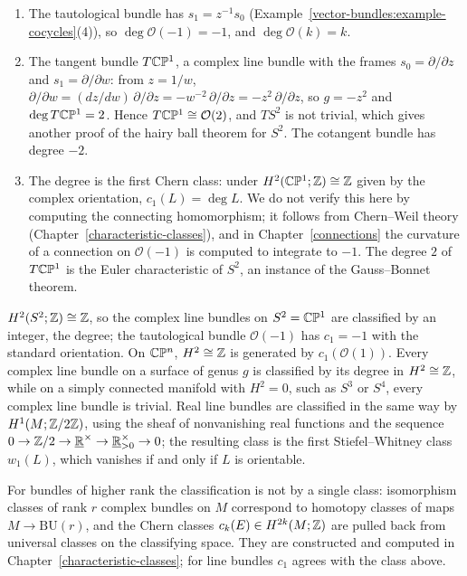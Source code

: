 \begin{example}\label{vector-bundles:example-degrees}
\begin{enumerate}
\item The tautological bundle has $s_1 = z^{-1}s_0$ (Example~\ref{vector-bundles:example-cocycles}(4)), so $\deg\mathcal{O}(-1) = -1$, and $\deg\mathcal{O}(k) = k$.
\item The tangent bundle $T\mathbb{C}\mathbb{P}^1$, a complex line bundle with the frames $s_0 = \partial/\partial z$ and $s_1 = \partial/\partial w$: from $z = 1/w$,
$\partial/\partial w = (dz/dw)\,\partial/\partial z = -w^{-2}\,\partial/\partial z = -z^2\,\partial/\partial z$, so $g = -z^2$ and $\deg T\mathbb{C}\mathbb{P}^1 = 2$. Hence
$T\mathbb{C}\mathbb{P}^1 \cong \mathcal{O}(2)$, and $TS^2$ is not trivial, which gives another proof of the hairy ball theorem for $S^2$. The cotangent bundle has degree $-2$.
\item The degree is the first Chern class: under $H^2(\mathbb{C}\mathbb{P}^1; \mathbb{Z}) \cong \mathbb{Z}$ given by the complex orientation, $c_1(L) = \deg L$. We do not verify this here by computing the
connecting homomorphism; it follows from Chern--Weil theory (Chapter~\ref{characteristic-classes}), and in Chapter~\ref{connections} the curvature of a connection on
$\mathcal{O}(-1)$ is computed to integrate to $-1$. The degree $2$ of $T\mathbb{C}\mathbb{P}^1$ is the Euler characteristic of $S^2$, an instance of the Gauss--Bonnet theorem.
\end{enumerate}
\end{example}

\begin{example}\label{vector-bundles:example-line-bundles}
$H^2(S^2; \mathbb{Z}) \cong \mathbb{Z}$, so the complex line bundles on $S^2 = \mathbb{C}\mathbb{P}^1$ are classified by an integer, the degree; the tautological bundle $\mathcal{O}(-1)$ has $c_1 = -1$ with the standard
orientation. On $\mathbb{C}\mathbb{P}^n$, $H^2 \cong \mathbb{Z}$ is generated by $c_1(\mathcal{O}(1))$. Every complex line bundle on a surface of genus $g$ is classified by its degree in $H^2 \cong \mathbb{Z}$, while on a simply
connected manifold with $H^2 = 0$, such as $S^3$ or $S^4$, every complex line bundle is trivial. Real line bundles are classified in the same way by
$H^1(M; \mathbb{Z}/2\mathbb{Z})$, using the sheaf of nonvanishing real functions and the sequence $0 \to \mathbb{Z}/2 \to \underline{\mathbb{R}}^\times \to \underline{\mathbb{R}}^\times_{>0} \to 0$; the resulting class is the first
Stiefel--Whitney class $w_1(L)$, which vanishes if and only if $L$ is orientable.
\end{example}

\begin{remark}\label{vector-bundles:remark-higher-chern}
For bundles of higher rank the classification is not by a single class: isomorphism classes of rank $r$ complex bundles on $M$ correspond to homotopy classes of maps $M \to \mathrm{BU}(r)$, and the Chern
classes $c_k(E) \in H^{2k}(M; \mathbb{Z})$ are pulled back from universal classes on the classifying space. They are constructed and computed in Chapter~\ref{characteristic-classes}; for line bundles $c_1$ agrees
with the class above.
\end{remark}

